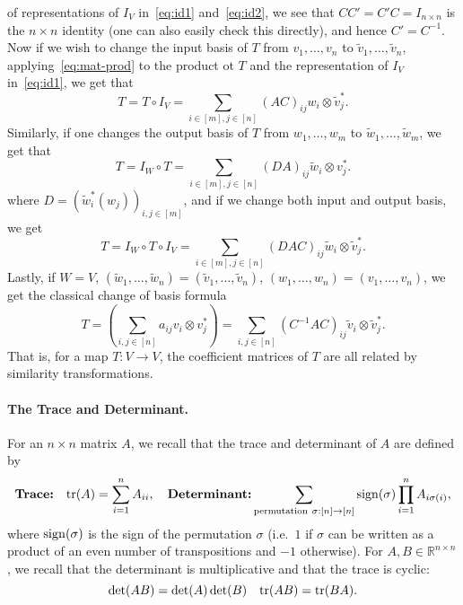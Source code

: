 \documentclass[11pt]{article}
\theoremstyle{plain}
\theoremstyle{plain}
\newcommand{\R}{\ensuremath{\mathbb{R}}}
\begin{document}
of representations of $I_V$ in~\eqref{eq:id1} and~\eqref{eq:id2}, we see that $C
C' = C' C = I_{n \times n}$ is the $n \times n$ identity (one can also easily
check this directly), and hence $C' = C^{-1}$. Now if we wish to change the
input basis of $T$ from $v_1,\dots,v_n$ to $\tilde{v}_1,\dots,\tilde{v}_n$,
applying~\eqref{eq:mat-prod} to the product ot $T$ and the representation of
$I_V$ in~\eqref{eq:id1}, we get that 
\begin{equation}
T = T \circ I_V = \sum_{i \in [m], j \in [n]} (AC)_{ij} w_i \otimes
\tilde{v}_j^* \label{eq:change-input}.
\end{equation}
Similarly, if one changes the output basis of $T$ from $w_1,\dots,w_m$ to
$\tilde{w}_1,\dots,\tilde{w}_m$, we get that
\begin{equation}
T = I_W \circ T = \sum_{i \in [m], j \in [n]} (DA)_{ij} \tilde{w}_i \otimes
v_j^* \label{eq:change-output}.
\end{equation}
where $D = (\tilde{w}_i^*(w_j))_{i,j \in [m]}$, and if we change both input and
output basis, we get
\begin{equation}
T = I_W \circ T \circ I_V = \sum_{i \in [m], j \in [n]} (DAC)_{ij} \tilde{w}_i
\otimes \tilde{v}_j^* \label{eq:change-input-output}.
\end{equation}
Lastly, if $W=V$, $(\tilde{w}_1,\dots,\tilde{w}_n) =
(\tilde{v}_1,\dots,\tilde{v}_n)$, $(w_1,\dots,w_n) = (v_1,\dots,v_n)$, we get
the classical change of basis formula
\begin{equation}
T = (\sum_{i,j \in [n]} a_{ij} v_i \otimes v_j^*) = \sum_{i, j \in [n]}
(C^{-1}AC)_{ij} \tilde{v}_i \otimes \tilde{v}_j^* \label{eq:change-of-basis}.
\end{equation}
That is, for a map $T: V \rightarrow V$, the coefficient matrices of $T$ are all
related by similarity transformations.

\paragraph{\bf The Trace and Determinant.} For an $n \times n$ matrix $A$, we
recall that the trace and determinant of $A$ are defined by
\[
\text{\bf Trace:} \quad {\rm tr}(A) = \sum_{i=1}^n A_{ii}, \quad \text{\bf
Determinant:} \sum_{{\rm permutation}~\sigma: [n] \rightarrow [n]} {\rm sign}(\sigma) \prod_{i=1}^n A_{i\sigma(i)} ,
\]
where ${\rm sign}(\sigma)$ is the sign of the permutation $\sigma$ (i.e.~$1$ if
$\sigma$ can be written as a product of an even number of transpositions and
$-1$ otherwise). For $A,B \in \R^{n \times n}$, we recall that the determinant
is multiplicative and that the trace is cyclic: 
\[
\det(A B) = \det(A) \det(B) \quad {\rm tr}(AB) = {\rm tr}(BA).
\]
\end{document}
